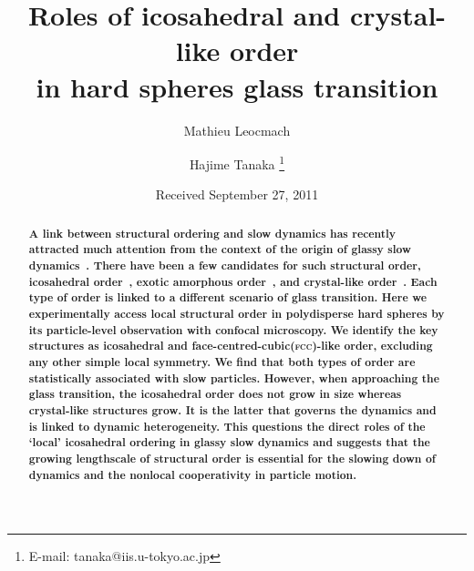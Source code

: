 


\title{Roles of icosahedral and crystal-like order \\ in hard spheres glass transition} 


\author{Mathieu Leocmach} 

\author{Hajime Tanaka \footnote{E-mail: tanaka@iis.u-tokyo.ac.jp}} 

\date{Received September 27, 2011}

\begin{abstract}
\textbf{
A link between structural ordering and slow dynamics has recently attracted much attention from the context of the origin of glassy slow dynamics~\citep{cavagna2009supercooled,BerthierR}. There have been a few candidates for such structural order, icosahedral order~\cite{steinhardt1983boo,sadoc1999geometrical, tarjus2005fba}, exotic amorphous order~\cite{lubchenko2007}, and crystal-like order~\cite{tanaka2010critical}. Each type of order is linked to a different scenario of glass transition. Here we experimentally access local structural order in polydisperse hard spheres by its particle-level observation with confocal microscopy. We identify the key structures as icosahedral and face-centred-cubic(\textmd{\textsc{fcc}})-like order, excluding any other simple local symmetry. We find that both types of order are statistically associated with slow particles. However, when approaching the glass transition, the icosahedral order does not grow in size whereas crystal-like structures grow. It is the latter that governs the dynamics and is linked to dynamic heterogeneity. This questions the direct roles of the `local' icosahedral ordering in glassy slow dynamics and suggests that the growing lengthscale of structural order is essential for the slowing down of dynamics and the nonlocal cooperativity in particle motion. 
}
\end{abstract}
\maketitle



